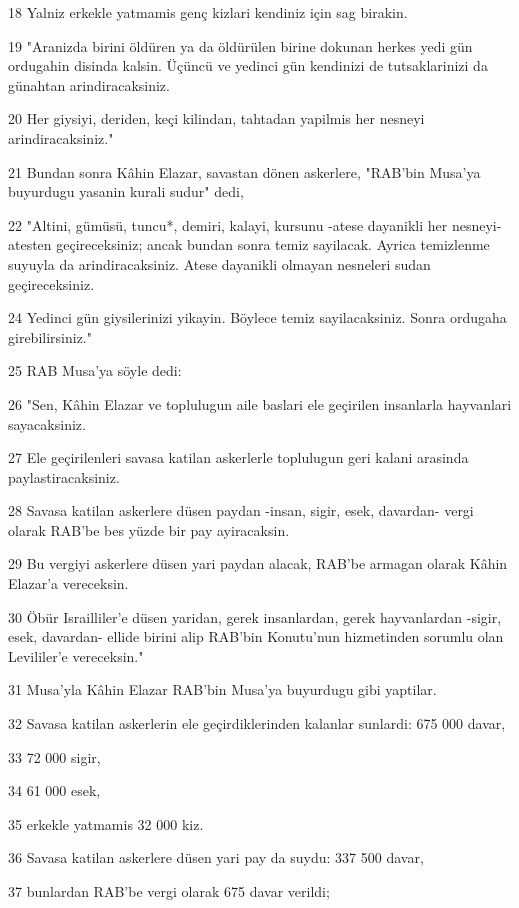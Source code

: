 \par 18 Yalniz erkekle yatmamis genç kizlari kendiniz için sag birakin.
\par 19 "Aranizda birini öldüren ya da öldürülen birine dokunan herkes yedi gün ordugahin disinda kalsin. Üçüncü ve yedinci gün kendinizi de tutsaklarinizi da günahtan arindiracaksiniz.
\par 20 Her giysiyi, deriden, keçi kilindan, tahtadan yapilmis her nesneyi arindiracaksiniz."
\par 21 Bundan sonra Kâhin Elazar, savastan dönen askerlere, "RAB'bin Musa'ya buyurdugu yasanin kurali sudur" dedi,
\par 22 "Altini, gümüsü, tuncu*, demiri, kalayi, kursunu -atese dayanikli her nesneyi- atesten geçireceksiniz; ancak bundan sonra temiz sayilacak. Ayrica temizlenme suyuyla da arindiracaksiniz. Atese dayanikli olmayan nesneleri sudan geçireceksiniz.
\par 24 Yedinci gün giysilerinizi yikayin. Böylece temiz sayilacaksiniz. Sonra ordugaha girebilirsiniz."
\par 25 RAB Musa'ya söyle dedi:
\par 26 "Sen, Kâhin Elazar ve toplulugun aile baslari ele geçirilen insanlarla hayvanlari sayacaksiniz.
\par 27 Ele geçirilenleri savasa katilan askerlerle toplulugun geri kalani arasinda paylastiracaksiniz.
\par 28 Savasa katilan askerlere düsen paydan -insan, sigir, esek, davardan- vergi olarak RAB'be bes yüzde bir pay ayiracaksin.
\par 29 Bu vergiyi askerlere düsen yari paydan alacak, RAB'be armagan olarak Kâhin Elazar'a vereceksin.
\par 30 Öbür Israilliler'e düsen yaridan, gerek insanlardan, gerek hayvanlardan -sigir, esek, davardan- ellide birini alip RAB'bin Konutu'nun hizmetinden sorumlu olan Levililer'e vereceksin."
\par 31 Musa'yla Kâhin Elazar RAB'bin Musa'ya buyurdugu gibi yaptilar.
\par 32 Savasa katilan askerlerin ele geçirdiklerinden kalanlar sunlardi: 675 000 davar,
\par 33 72 000 sigir,
\par 34 61 000 esek,
\par 35 erkekle yatmamis 32 000 kiz.
\par 36 Savasa katilan askerlere düsen yari pay da suydu: 337 500 davar,
\par 37 bunlardan RAB'be vergi olarak 675 davar verildi;
